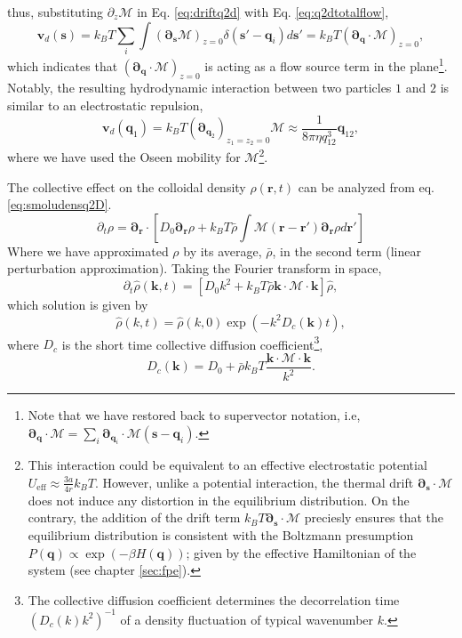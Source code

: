 \documentclass[twoside,openright,titlepage,numbers=noenddot,%
headinclude,footinclude,cleardoublepage=empty,abstract=on,
BCOR=5mm,fontsize=11pt, dvipsnames, paper=b5
]{scrreprt}
\renewcommand{\vec}[1]{\bm{#1}}
\newcommand{\tens}[1]{\bm{\mathcal{#1}}}
\newcommand{\kT}{k_B T}
\newcommand{\ppos}{q}
\newcommand{\fpos}{r}
\newcommand{\fvel}{v}
\begin{document}
thus, substituting $\partial_z\tens{M}$ in Eq. \eqref{eq:driftq2d} with Eq. \eqref{eq:q2dtotalflow},
\begin{equation}
  \label{eq:flowq2Ddivergence}
  \vec{\fvel}_d(\vec{s}) = \kT\sum_i \int \left( \vec{\partial}_{\vec{s}}\tens{M} \right)_{z=0} \delta(\vec{s}' - \vec{\ppos}_i)d\vec{s}' = \kT\left(\vec{\partial}_{\vec{\ppos}}\cdot\tens{M}\right)_{z=0},
\end{equation}
which indicates that $\left(\vec{\partial}_{\vec{\ppos}}\cdot\tens{M}\right)_{z=0}$ is acting as a flow source term in the plane\footnote{Note that we have restored back to supervector notation, i.e, $\vec{\partial}_{\vec{\ppos}}\cdot\tens{M} = \sum_i\vec{\partial}_{\vec{\ppos}_i}\cdot\tens{M}(\vec{s}-\vec{q}_i)$.}. Notably, the resulting hydrodynamic interaction between two particles $1$ and $2$ is similar to an electrostatic repulsion,
\begin{equation}
  \label{eq:q2Deffrepulsion}
  \vec{\fvel}_d(\vec{q}_1) = \kT\left(\vec{\partial}_{\vec{q}_2}\right)_{z_1=z_2=0}\tens{M} \approx \frac{1}{8\pi\eta q_{12}^3}\vec{q}_{12},
\end{equation}
where we have used the Oseen mobility for $\tens{M}$\footnote{This interaction could be equivalent to an effective electrostatic potential $U_{\text{eff}} \approx \frac{3a}{4r}\kT$. However, unlike a potential interaction, the thermal drift $\vec{\partial}_{\vec{s}}\cdot\tens{M}$ does not induce any distortion in the equilibrium distribution. On the contrary, the addition of the drift term $\kT\vec{\partial}_{\vec{s}}\cdot\tens{M}$ preciesly ensures that the equilibrium distribution is consistent with the Boltzmann presumption $P(\vec{\ppos}) \propto \exp({-\beta}H(\vec{\ppos}))$; given by the effective Hamiltonian of the system (see chapter \ref{sec:fpe}).}.

The collective effect on the colloidal density $\rho(\vec{\fpos},t)$ can be analyzed from eq. \eqref{eq:smoludensq2D}.
\begin{equation}
  \partial_t \rho = \vec{\partial}_{\vec{\fpos}}\cdot\left[D_0\vec{\partial}_{\vec{\fpos}}\rho + \kT \bar{\rho}\int\tens{M}(\vec{\fpos}-\vec{\fpos}')\vec{\partial}_{\vec{\fpos}}\rho d\vec{\fpos}'\right]
\end{equation}
Where we have approximated $\rho$ by its average, $\bar{\rho}$, in the second term (linear perturbation approximation).
Taking the Fourier transform in space,
\begin{equation}
  \partial_t \hat{\rho}(\vec{k},t) = \left[D_0k^2 + \kT \bar{\rho}\vec{k}\cdot\tens{M}\cdot{\vec{k}}\right]\hat{\rho},
\end{equation}
which solution is given by
\begin{equation}
  \hat{\rho}(k,t) = \hat{\rho}(k,0)\exp\left(-k^2D_c(\vec{k}) t\right), 
\end{equation}
where $D_c$ is the short time collective diffusion coefficient\footnote{The collective diffusion coefficient determines the decorrelation time $\left(D_c(k)k^2\right)^{-1}$ of a density fluctuation of typical wavenumber $k$.},
\begin{equation}
  D_c(\vec{k}) = D_0 + \bar{\rho}\kT \frac{\vec{k}\cdot\tens{M}\cdot{\vec{k}}}{k^2}.
\end{equation}
\end{document}
